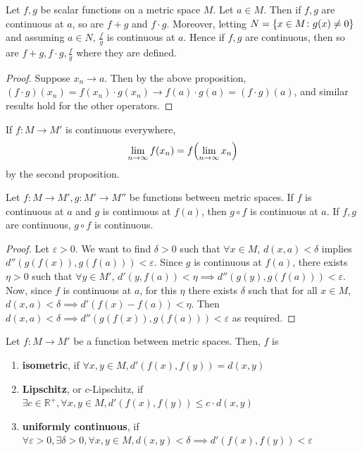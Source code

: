 \documentclass[a4paper]{article}
\begin{document}
\begin{proposition}
	Let \( f,g \) be scalar functions on a metric space \( M \).
	Let \( a \in M \).
	Then if \( f,g \) are continuous at \( a \), so are \( f+g \) and \( f \cdot g \).
	Moreover, letting \( N = \qty{x \in M \colon g(x) \neq 0} \) and assuming \( a \in N \), \( \frac{f}{g} \) is continuous at \( a \).
	Hence if \( f,g \) are continuous, then so are \( f+g, f \cdot g, \frac{f}{g} \) where they are defined.
\end{proposition}
\begin{proof}
	Suppose \( x_n \to a \).
	Then by the above proposition, \( (f\cdot g)(x_n) = f(x_n) \cdot g(x_n) \to f(a) \cdot g(a) = (f \cdot g)(a) \), and similar results hold for the other operators.
\end{proof}
\begin{remark}
	If \( f \colon M \to M' \) is continuous everywhere,
	\[
		\lim_{n \to \infty} f(x_n) = f\qty(\lim_{n \to \infty} x_n)
	\]
	by the second proposition.
\end{remark}
\begin{proposition}
	Let \( f \colon M \to M', g \colon M' \to M'' \) be functions between metric spaces.
	If \( f \) is continuous at \( a \) and \( g \) is continuous at \( f(a) \), then \( g \circ f \) is continuous at \( a \).
	If \( f,g \) are continuous, \( g \circ f \) is continuous.
\end{proposition}
\begin{proof}
	Let \( \varepsilon > 0 \).
	We want to find \( \delta > 0 \) such that \( \forall x \in M \), \( d(x,a) < \delta \) implies \( d''(g(f(x)), g(f(a))) < \varepsilon \).
	Since \( g \) is continuous at \( f(a) \), there exists \( \eta > 0 \) such that \( \forall y \in M' \), \( d'(y,f(a)) < \eta \implies d''(g(y), g(f(a))) < \varepsilon \).
	Now, since \( f \) is continuous at \( a \), for this \( \eta \) there exists \( \delta \) such that for all \( x \in M \), \( d(x,a) < \delta \implies d'(f(x) - f(a)) < \eta \).
	Then \( d(x,a) < \delta \implies d''(g(f(x)), g(f(a))) < \varepsilon \) as required.
\end{proof}

\begin{definition}
	Let \( f \colon M \to M' \) be a function between metric spaces.
	Then, \( f \) is
	\begin{enumerate}
		\item \textbf{isometric}, if \( \forall x,y \in M, d'(f(x),f(y)) = d(x,y) \)
		\item \textbf{Lipschitz}, or \( c \)-Lipschitz, if \( \exists c \in \mathbb R^+, \forall x,y \in M, d'(f(x),f(y)) \leq c\cdot d(x,y) \)
		\item \textbf{uniformly continuous}, if \( \forall \varepsilon > 0, \exists \delta > 0, \forall x,y \in M, d(x,y) < \delta \implies d'(f(x), f(y)) < \varepsilon \)
	\end{enumerate}
\end{definition}
\end{document}
